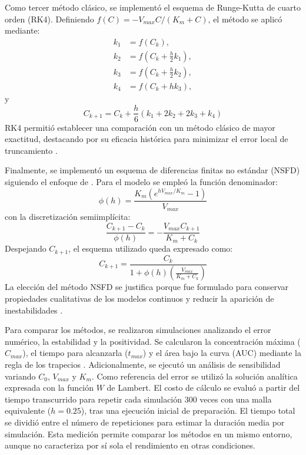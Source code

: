 \documentclass[11pt,final,5p,times,twocolumn,authoryear]{elsarticle}
\begin{document}
Como tercer método clásico, se implementó el esquema de Runge-Kutta de cuarto orden (RK4). Definiendo $f(C) = -V_{max}C / (K_m+C)$, el método se aplicó mediante:
\begin{align}
k_1 &= f(C_k), \\
k_2 &= f\left(C_k + \frac{h}{2}k_1\right), \\
k_3 &= f\left(C_k + \frac{h}{2}k_2\right), \\
k_4 &= f(C_k + hk_3),
\end{align}
y 
\begin{equation}
C_{k+1} = C_k + \frac{h}{6}(k_1 + 2k_2 + 2k_3 + k_4)
\end{equation}
RK4 permitió establecer una comparación con un método clásico de mayor exactitud, destacando por su eficacia histórica para minimizar el error local de truncamiento \citep{butcher1996}.

Finalmente, se implementó un esquema de diferencias finitas no estándar (NSFD) siguiendo el enfoque de \citet{mickens2002}. Para el modelo se empleó la función denominador:
\begin{equation}
\phi(h) = \frac{K_m(e^{hV_{max}/K_m}-1)}{V_{max}}
\end{equation}
con la discretización semiimplícita:
\begin{equation}
\frac{C_{k+1}-C_k}{\phi(h)} = -\frac{V_{max}C_{k+1}}{K_m+C_k}
\end{equation}
Despejando $C_{k+1}$, el esquema utilizado queda expresado como:
\begin{equation}
C_{k+1} = \frac{C_k}{1 + \phi(h)\left(\frac{V_{max}}{K_m+C_k}\right)}
\end{equation}
La elección del método NSFD se justifica porque fue formulado para conservar propiedades cualitativas de los modelos continuos y reducir la aparición de inestabilidades \citep{egbelowo2018}.

Para comparar los métodos, se realizaron simulaciones analizando el error numérico, la estabilidad y la positividad. Se calcularon la concentración máxima ($C_{max}$), el tiempo para alcanzarla ($t_{max}$) y el área bajo la curva (AUC) mediante la regla de los trapecios \citep{purves1992}. Adicionalmente, se ejecutó un análisis de sensibilidad variando $C_0$, $V_{max}$ y $K_m$. Como referencia del error se utilizó la solución analítica expresada con la función $W$ de Lambert. El costo de cálculo se evaluó a partir del tiempo transcurrido para repetir cada simulación 300 veces con una malla equivalente ($h=0.25$), tras una ejecución inicial de preparación. El tiempo total se dividió entre el número de repeticiones para estimar la duración media por simulación. Esta medición permite comparar los métodos en un mismo entorno, aunque no caracteriza por sí sola el rendimiento en otras condiciones.
\end{document}
